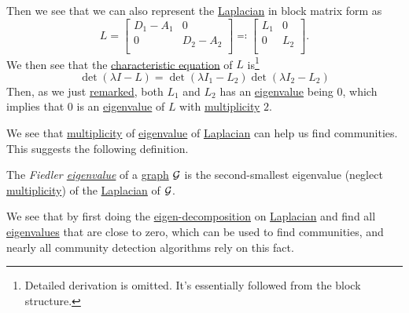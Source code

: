 Then we see that we can also represent the \hyperref[def:Laplacian]{Laplacian} in block matrix form as
\[
	L = \begin{bmatrix}
		D_{1} - A_{1} & 0         \\
		0             & D_2 - A_2 \\
	\end{bmatrix} \eqqcolon \begin{bmatrix}
		L_{1} & 0   \\
		0     & L_2 \\
	\end{bmatrix}.
\]
We then see that the \hyperref[note:characteristic-equation]{characteristic equation} of \(L\) is\footnote{Detailed derivation is omitted. It's essentially followed from the block structure.}
\[
	\det(\lambda I - L) = \det(\lambda I_1 - L_2)\det(\lambda  I_2 - L_2)
\]
Then, as we just \hyperref[rmk:property-of-Laplacian]{remarked}, both \(L_1\) and \(L_2\) has an \hyperref[def:eigenvalue]{eigenvalue} being \(0\), which implies that \(0\) is
an \hyperref[def:eigenvalue]{eigenvalue} of \(L\) with \hyperref[def:multiplicity]{multiplicity} \(2\).

We see that \hyperref[def:multiplicity]{multiplicity} of \hyperref[def:eigenvalue]{eigenvalue} of \hyperref[def:Laplacian]{Laplacian} can help us find communities.
This suggests the following definition.

\begin{definition}\label{def:Filder-eigenvalue}
	The \emph{Fiedler \hyperref[def:eigenvalue]{eigenvalue}} of a \hyperref[def:graph]{graph} \(\mathcal{\MakeUppercase{g}}\) is the second-smallest eigenvalue
	(neglect \hyperref[def:multiplicity]{multiplicity}) of the \hyperref[def:Laplacian]{Laplacian} of \(\mathcal{\MakeUppercase{g}}\).
\end{definition}

We see that by first doing the \hyperref[thm:eigen-decomposition]{eigen-decomposition} on \hyperref[def:Laplacian]{Laplacian} and find all
\hyperref[def:eigenvalue]{eigenvalues} that are close to zero, which can be used to find communities, and nearly all community detection
algorithms rely on this fact.

